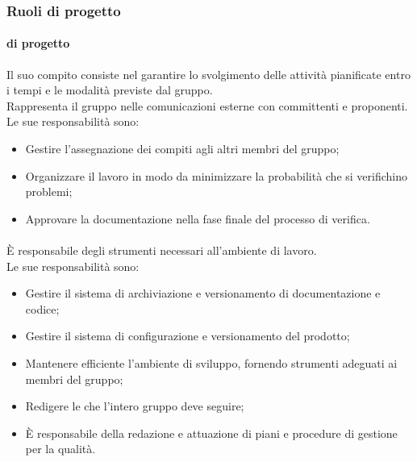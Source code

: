   \subsubsection{Ruoli di progetto}
  \paragraph{\roleProjectManager{} di progetto}
      Il suo compito consiste nel garantire lo svolgimento delle attività pianificate entro i tempi e le modalità previste dal gruppo.\\
        Rappresenta il gruppo nelle comunicazioni esterne con committenti e proponenti.\\
        Le sue responsabilità sono:
        \begin{itemize}
          \item Gestire l'assegnazione dei compiti agli altri membri del gruppo;
          \item Organizzare il lavoro in modo da minimizzare la probabilità che si verifichino problemi;
          \item Approvare la documentazione nella fase finale del processo di verifica.
        \end{itemize}

      \paragraph{\roleAdministrator{}}
        È responsabile degli strumenti necessari all'ambiente di lavoro.\\
        Le sue responsabilità sono:
        \begin{itemize}
          \item Gestire il sistema di archiviazione e versionamento di documentazione e codice;
          \item Gestire il sistema di configurazione e versionamento del prodotto;
          \item Mantenere efficiente l'ambiente di sviluppo, fornendo strumenti adeguati ai membri del gruppo;
          \item Redigere le \docNameVersionNdP{} che l'intero gruppo deve seguire;
          \item È responsabile della redazione e attuazione di piani e procedure di gestione per la qualità.
        \end{itemize}

